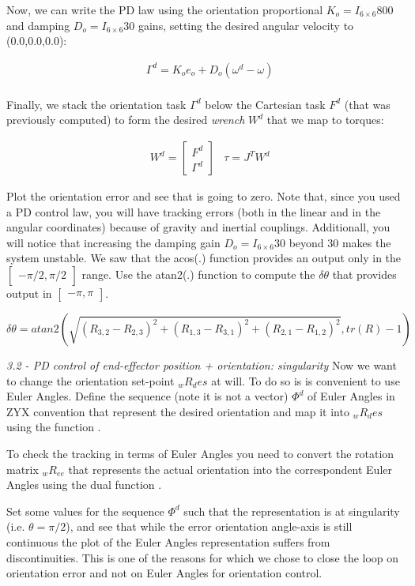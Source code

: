 \documentclass[11pt]{article}
\newcommand{\mat}[1]{\ensuremath{\begin{bmatrix}#1\end{bmatrix}}}	%
\begin{document}
Now, we can write the PD law using the orientation proportional $K_{o} = I_{6\times6}800$ and damping $D_o = I_{6\times6}30$ gains, setting the desired angular velocity to (0.0,0.0,0.0): 

\begin{align}
& \Gamma^d  = K_{o} e_o  + D_o(\omega^d - \omega)  \\
\end{align}

Finally, we stack the orientation task $\Gamma^d$ below  the Cartesian task $F^d$ (that was previously computed) to form the desired \textit{wrench} $W^d$ that we map to torques:

\begin{align}
&W^d=\mat{F^d \\ \Gamma^d}
&\tau = J^TW^d
\end{align}

Plot   the  orientation error and see that is going to zero.
 Note that, since you used a PD control law,  you will have tracking errors (both in the linear and in the angular  coordinates) because of gravity and inertial couplings. Additionall, you will notice that increasing the damping gain  $D_o = I_{6\times6}30$ beyond 30 makes the system unstable.
We saw that the acos(.) function provides an output only in the $\mat{ -\pi / 2  , \pi /2}$ range. 
Use the atan2(.) function to compute the $\delta \theta$ that provides output in $\mat{ -\pi   , \pi }$.

\begin{equation}
\delta \theta = atan2\left(\sqrt{(R_{3,2} - R_{2,3})^2 + (R_{1,3} - R_{3,1})^2 + (R_{2,1} - R_{1,2})^2}, tr(R) -1\right)
\end{equation}

\quad

\noindent
\textit{3.2 - PD control of end-effector position + orientation: singularity}
Now we want to change the orientation set-point  ${}_wR_des$ at will. To do so 
is is convenient to use Euler Angles. Define the sequence (note it is not a vector)  $\Phi^d$ of Euler Angles in ZYX convention that represent the desired orientation and map it into ${}_wR_des$ using the function  . 

To check the tracking in terms of Euler Angles you need to convert the rotation matrix ${}_wR_{ee}$ that represents the actual orientation  into the correspondent Euler Angles using the dual function .

Set some values for the sequence $\Phi^d$ such that the representation is at singularity (i.e. $\theta = \pi/2$), and see that while the error orientation angle-axis is still continuous the plot of the Euler Angles representation suffers from discontinuities. This is one of the reasons for which we chose to close the loop on orientation error and not on Euler Angles for orientation control.
\end{document}
